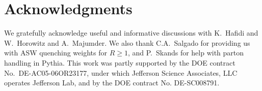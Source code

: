 \section*{Acknowledgments}

We gratefully acknowledge useful and informative discussions with K.~Hafidi and W.~Horowitz and A.~Majumder. We also thank C.A.~Salgado for providing us with ASW quenching weights for $R \geq 1$, and P.~Skands for help with parton handling in Pythia.
This work was partly supported by the DOE contract No.~DE-AC05-06OR23177,
under which Jefferson Science Associates, LLC operates Jefferson Lab, and by the DOE contract No. DE-SC008791.








